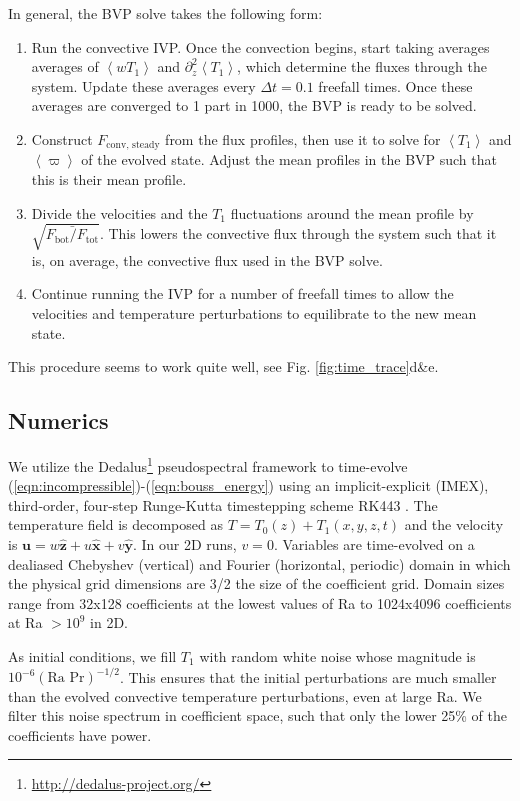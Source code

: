 \documentclass[aps, pre, onecolumn, nofootinbib, notitlepage, groupedaddress, amsfonts, amssymb, amsmath, longbibliography]{revtex4-1}
\newcommand{\angles}[1]{\ensuremath{\left\langle #1 \right\rangle}}
\begin{document}
In general, the BVP solve takes the following form:
\begin{enumerate}
\item Run the convective IVP. Once the convection begins, start taking averages averages of $\angles{wT_1}$
and $\partial_z^2\angles{T_1}$, which determine the fluxes through the system.  Update these averages every
$\Delta t = 0.1$ freefall times.  Once these averages are converged to 1 part in 1000, the BVP is ready to be solved.
\item Construct $F_{\text{conv, steady}}$ from the flux profiles, then use it to solve for $\angles{T_1}$ 
and \angles{\varpi} of the
evolved state.  Adjust the mean profiles in the BVP such that this is their mean profile.
\item Divide the velocities and the $T_1$ fluctuations around the mean profile by 
$\sqrt{\bar{F_{\text{bot}}/F_{\text{tot}}}}$. This lowers the convective flux through the system such that it is,
on average, the convective flux used in the BVP solve.
\item Continue running the IVP for a number of freefall times to allow the velocities and temperature perturbations
to equilibrate to the new mean state.
\end{enumerate}
This procedure seems to work quite well, see Fig. \ref{fig:time_trace}d\&e.


\subsection{Numerics}
We utilize the 
Dedalus\footnote{\url{http://dedalus-project.org/}} 
pseudospectral framework \cite{burns&all2016} to time-evolve  
(\ref{eqn:incompressible})-(\ref{eqn:bouss_energy}) 
using an implicit-explicit (IMEX), third-order, four-step 
Runge-Kutta timestepping scheme RK443 \cite{ascher&all1997}.  
The temperature field is decomposed as $T = T_0(z) + T_1(x, y, z, t)$
and the velocity is $\bm{u} = w\bm{\hat{z}} + u\bm{\hat{x}} + v\bm{\hat{y}}$.
In our 2D runs, $v = 0$.
Variables are time-evolved on a dealiased Chebyshev (vertical)
and Fourier (horizontal, periodic) domain in which the
physical grid dimensions are 3/2 the size of the coefficient grid.  
Domain sizes range from
32x128 coefficients at the lowest values of 
Ra to 1024x4096 coefficients at Ra $> 10^{9}$ in 2D.

As initial conditions, we fill $T_1$ with
random white noise whose magnitude is $10^{-6}(\text{Ra Pr})^{-1/2}$.
This ensures that the initial perturbations are much smaller than the
evolved convective temperature perturbations, even at large Ra.
We filter this noise spectrum in coefficient space, 
such that only the lower 25\% of the coefficients
have power.
\end{document}
